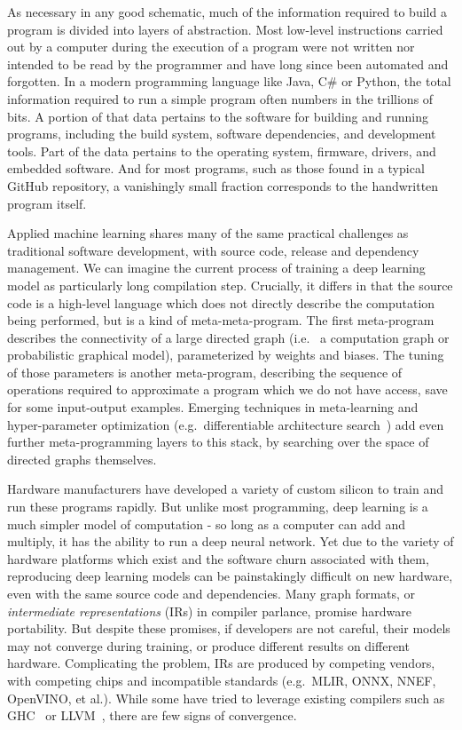 \documentclass[12pt,initial,twoside,maitrise]{dms}
\numberwithin{equation}{section}
\numberwithin{table}{chapter}
\numberwithin{figure}{chapter}
\begin{document}
As necessary in any good schematic, much of the information required to build a program is divided into layers of abstraction. Most low-level instructions carried out by a computer during the execution of a program were not written nor intended to be read by the programmer and have long since been automated and forgotten. In a modern programming language like Java, C\# or Python, the total information required to run a simple program often numbers in the trillions of bits. A portion of that data pertains to the software for building and running programs, including the build system, software dependencies, and development tools. Part of the data pertains to the operating system, firmware, drivers, and embedded software. And for most programs, such as those found in a typical GitHub repository, a vanishingly small fraction corresponds to the handwritten program itself.

Applied machine learning shares many of the same practical challenges as traditional software development, with source code, release and dependency management. We can imagine the current process of training a deep learning model as particularly long compilation step. Crucially, it differs in that the source code is a high-level language which does not directly describe the computation being performed, but is a kind of meta-meta-program. The first meta-program describes the connectivity of a large directed graph (i.e.~ a computation graph or probabilistic graphical model), parameterized by weights and biases. The tuning of those parameters is another meta-program, describing the sequence of operations required to approximate a program which we do not have access, save for some input-output examples. Emerging techniques in meta-learning and hyper-parameter optimization (e.g.~differentiable architecture search~\cite{liu2018darts}) add even further meta-programming layers to this stack, by searching over the space of directed graphs themselves.

Hardware manufacturers have developed a variety of custom silicon to train and run these programs rapidly. But unlike most programming, deep learning is a much simpler model of computation - so long as a computer can add and multiply, it has the ability to run a deep neural network. Yet due to the variety of hardware platforms which exist and the software churn associated with them, reproducing deep learning models can be painstakingly difficult on new hardware, even with the same source code and dependencies. Many graph formats, or \textit{intermediate representations} (IRs) in compiler parlance, promise hardware portability. But despite these promises, if developers are not careful, their models may not converge during training, or produce different results on different hardware. Complicating the problem, IRs are produced by competing vendors, with competing chips and incompatible standards (e.g.~MLIR, ONNX, NNEF, OpenVINO, et al.). While some have tried to leverage existing compilers such as GHC~\cite{elliott2018simple} or LLVM~\cite{wei2017dlvm}, there are few signs of convergence.
\end{document}
